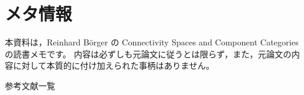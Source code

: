 \section{メタ情報}

本資料は，Reinhard B\"{o}rger の Connectivity Spaces and Component Categories の読書メモです。
内容は必ずしも元論文に従うとは限らず，また，元論文の内容に対して本質的に付け加えられた事柄はありません。

参考文献一覧
\cite{arhangelskii_wiegandt--1975}
\cite{boerger--1981}
\cite{herrlich--1968}
\cite{herrlich_salicrup--1979}
\cite{hoffmann--1968}
\cite{preuss--1967}
\cite{salicrup--1980}
\cite{salicrup_vazquez--1972}
\cite{strecker--1974}
